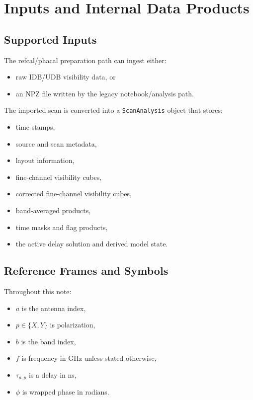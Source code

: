 \documentclass[11pt]{article}
\begin{document}
\section{Inputs and Internal Data Products}

\subsection{Supported Inputs}

The refcal/phacal preparation path can ingest either:
\begin{itemize}[leftmargin=1.5em]
  \item raw IDB/UDB visibility data, or
  \item an NPZ file written by the legacy notebook/analysis path.
\end{itemize}

The imported scan is converted into a \texttt{ScanAnalysis} object that stores:
\begin{itemize}[leftmargin=1.5em]
  \item time stamps,
  \item source and scan metadata,
  \item layout information,
  \item fine-channel visibility cubes,
  \item corrected fine-channel visibility cubes,
  \item band-averaged products,
  \item time masks and flag products,
  \item the active delay solution and derived model state.
\end{itemize}

\subsection{Reference Frames and Symbols}

Throughout this note:
\begin{itemize}[leftmargin=1.5em]
  \item $a$ is the antenna index,
  \item $p \in \{X,Y\}$ is polarization,
  \item $b$ is the band index,
  \item $f$ is frequency in GHz unless stated otherwise,
  \item $\tau_{a,p}$ is a delay in ns,
  \item $\phi$ is wrapped phase in radians.
\end{itemize}
\end{document}
